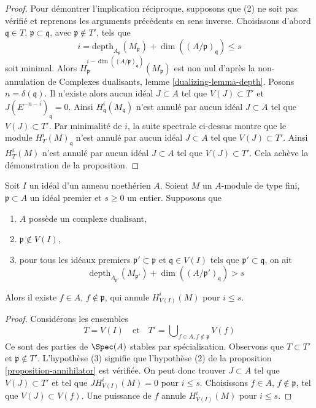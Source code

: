 \begin{proof}
\medskip\noindent
Pour démontrer l'implication réciproque, supposons que (2) ne soit pas vérifié et reprenons les arguments précédents en sens inverse. Choisissons d'abord $\mathfrak q \in T$, $\mathfrak p \subset \mathfrak q$, avec $\mathfrak p \not \in T'$, tels que
$$
i = \text{depth}_{A_\mathfrak p}(M_\mathfrak p) +
\dim((A/\mathfrak p)_\mathfrak q) \leq s
$$
soit minimal. Alors $H^{i - \dim((A/\mathfrak p)_\mathfrak q)}_\mathfrak p(M_\mathfrak p)$ est non nul d'après la non-annulation de Complexes dualisants, lemme \ref{dualizing-lemma-depth}. Posons $n = \delta(\mathfrak q)$. Il n'existe alors aucun idéal $J \subset A$ tel que $V(J) \subset T'$ et $J(E^{-n - i})_\mathfrak q = 0$. Ainsi $H^i_\mathfrak q(M_\mathfrak q)$ n'est annulé par aucun idéal $J \subset A$ tel que $V(J) \subset T'$. Par minimalité de $i$, la suite spectrale ci-dessus montre que le module $H^i_T(M)_\mathfrak q$ n'est annulé par aucun idéal $J \subset A$ tel que $V(J) \subset T'$. Ainsi $H^i_T(M)$ n'est annulé par aucun idéal $J \subset A$ tel que $V(J) \subset T'$. Cela achève la démonstration de la proposition.
\end{proof}

\begin{lemma}
\label{lemma-kill-local-cohomology-at-prime}
Soit $I$ un idéal d'un anneau noethérien $A$. Soient $M$ un $A$-module de type fini, $\mathfrak p \subset A$ un idéal premier et $s \geq 0$ un entier. Supposons que
\begin{enumerate}
\item $A$ possède un complexe dualisant,
\item $\mathfrak p \not \in V(I)$,
\item pour tous les idéaux premiers $\mathfrak p' \subset \mathfrak p$ et $\mathfrak q \in V(I)$ tels que $\mathfrak p' \subset \mathfrak q$, on ait
$$
\text{depth}_{A_{\mathfrak p'}}(M_{\mathfrak p'}) +
\dim((A/\mathfrak p')_\mathfrak q) > s
$$
\end{enumerate}
Alors il existe $f \in A$, $f \not \in \mathfrak p$, qui annule $H^i_{V(I)}(M)$ pour $i \leq s$.
\end{lemma}

\begin{proof}
Considérons les ensembles
$$
T = V(I)
\quad\text{et}\quad
T' = \bigcup\nolimits_{f \in A, f \not \in \mathfrak p} V(f)
$$
Ce sont des parties de $\Spec(A)$ stables par spécialisation. Observons que $T \subset T'$ et $\mathfrak p \not \in T'$. L'hypothèse (3) signifie que l'hypothèse (2) de la proposition \ref{proposition-annihilator} est vérifiée. On peut donc trouver $J \subset A$ tel que $V(J) \subset T'$ et tel que $J H^i_{V(I)}(M) = 0$ pour $i \leq s$. Choisissons $f \in A$, $f \not \in \mathfrak p$, tel que $V(J) \subset V(f)$. Une puissance de $f$ annule $H^i_{V(I)}(M)$ pour $i \leq s$.
\end{proof}





